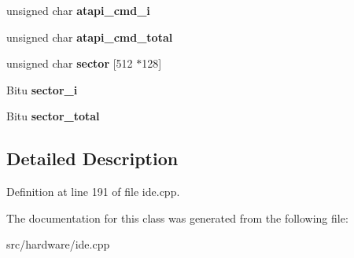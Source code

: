 \begin{DoxyCompactItemize}
\item 
\hypertarget{classIDEATAPICDROMDevice_a1e62a465becd556da27b8a060d8695fb}{unsigned char {\bfseries atapi\-\_\-cmd\-\_\-i}}\label{classIDEATAPICDROMDevice_a1e62a465becd556da27b8a060d8695fb}

\item 
\hypertarget{classIDEATAPICDROMDevice_a8cc1c7681f8c8c8e5ed93ef86995dd5a}{unsigned char {\bfseries atapi\-\_\-cmd\-\_\-total}}\label{classIDEATAPICDROMDevice_a8cc1c7681f8c8c8e5ed93ef86995dd5a}

\item 
\hypertarget{classIDEATAPICDROMDevice_a123cdf624128f5c142fc1f480e5ff91f}{unsigned char {\bfseries sector} \mbox{[}512 $\ast$128\mbox{]}}\label{classIDEATAPICDROMDevice_a123cdf624128f5c142fc1f480e5ff91f}

\item 
\hypertarget{classIDEATAPICDROMDevice_ad6b3e3413c5d7739939ca14eb1dff4b7}{Bitu {\bfseries sector\-\_\-i}}\label{classIDEATAPICDROMDevice_ad6b3e3413c5d7739939ca14eb1dff4b7}

\item 
\hypertarget{classIDEATAPICDROMDevice_a4a7e9b2a06f401201b6187679e2bbae5}{Bitu {\bfseries sector\-\_\-total}}\label{classIDEATAPICDROMDevice_a4a7e9b2a06f401201b6187679e2bbae5}

\end{DoxyCompactItemize}


\subsection{Detailed Description}


Definition at line 191 of file ide.\-cpp.



The documentation for this class was generated from the following file\-:\begin{DoxyCompactItemize}
\item 
src/hardware/ide.\-cpp\end{DoxyCompactItemize}
